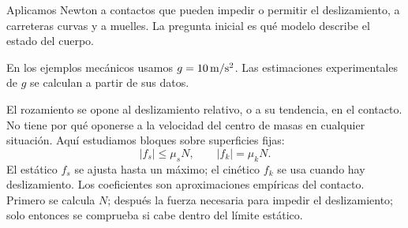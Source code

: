 \documentclass[11pt,a4paper]{article}
\begin{document}
\shorthandoff{<>}
\color{Ink}
Aplicamos Newton a contactos que pueden impedir o permitir el deslizamiento,
a carreteras curvas y a muelles. La pregunta inicial es qu\'e modelo describe
el estado del cuerpo.
\begin{lessonindex}
\end{lessonindex}
En los ejemplos mec\'anicos usamos $g=10\,\mathrm{m/s^2}$. Las estimaciones experimentales de
$g$ se calculan a partir de sus datos.
\precisionnote

El rozamiento se opone al deslizamiento relativo, o a su tendencia, en el contacto.
No tiene por qu\'e oponerse a la velocidad del centro de masas en cualquier situaci\'on.
Aqu\'i estudiamos bloques sobre superficies fijas:
\[
|f_s|\le\mu_sN,\qquad |f_k|=\mu_kN.
\]
El est\'atico $f_s$ se ajusta hasta un m\'aximo; el cin\'etico $f_k$ se usa
cuando hay deslizamiento. Los coeficientes son aproximaciones emp\'iricas del contacto.
Primero se calcula $N$; despu\'es la fuerza necesaria para impedir el deslizamiento;
solo entonces se comprueba si cabe dentro del l\'imite est\'atico.
\end{document}

